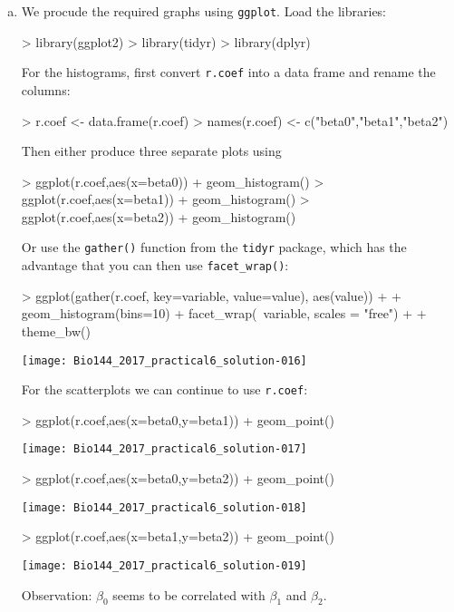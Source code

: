 \documentclass[a4paper,12pt]{scrartcl}
\begin{document}
\begin{enumerate}[a)]
\item We procude the required graphs using \texttt{ggplot}. Load the libraries:
\begin{Schunk}
\begin{Sinput}
> library(ggplot2)
> library(tidyr)
> library(dplyr)
\end{Sinput}
\end{Schunk}

For the histograms, first convert \texttt{r.coef} into a data frame and rename the columns:
\begin{Schunk}
\begin{Sinput}
> r.coef <- data.frame(r.coef)
> names(r.coef) <- c("beta0","beta1","beta2")
\end{Sinput}
\end{Schunk}
Then either produce three separate plots using
\begin{Schunk}
\begin{Sinput}
> ggplot(r.coef,aes(x=beta0)) + geom_histogram()
> ggplot(r.coef,aes(x=beta1)) + geom_histogram()
> ggplot(r.coef,aes(x=beta2)) + geom_histogram()
\end{Sinput}
\end{Schunk}

Or use the \texttt{gather()} function from the \texttt{tidyr} package, which has the advantage that you can then use \texttt{facet\_wrap()}:
\begin{Schunk}
\begin{Sinput}
> ggplot(gather(r.coef, key=variable, value=value), aes(value)) +
+   geom_histogram(bins=10) + facet_wrap(~variable, scales = "free") + 
+   theme_bw()
\end{Sinput}
\end{Schunk}
\texttt{[image: Bio144\_2017\_practical6\_solution-016]}




% 
For the scatterplots we can continue to use \texttt{r.coef}:

\begin{Schunk}
\begin{Sinput}
> ggplot(r.coef,aes(x=beta0,y=beta1)) + geom_point()  
\end{Sinput}
\end{Schunk}
\texttt{[image: Bio144\_2017\_practical6\_solution-017]}
\begin{Schunk}
\begin{Sinput}
> ggplot(r.coef,aes(x=beta0,y=beta2)) + geom_point()
\end{Sinput}
\end{Schunk}
\texttt{[image: Bio144\_2017\_practical6\_solution-018]}
\begin{Schunk}
\begin{Sinput}
> ggplot(r.coef,aes(x=beta1,y=beta2)) + geom_point()
\end{Sinput}
\end{Schunk}
\texttt{[image: Bio144\_2017\_practical6\_solution-019]}

Observation:  $\beta_0$ seems to be correlated with $\beta_1$ and $\beta_2$.

\end{enumerate}
\end{document}
